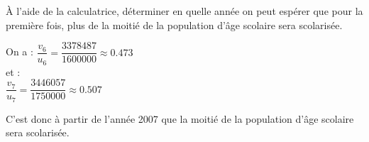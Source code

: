\begin{questions}
\begin{parts}
			
		\end{parts}
	
	\question[2] \`A l'aide de la calculatrice, déterminer en quelle année on peut espérer que pour la première fois, plus de la moitié de la population d'âge scolaire sera scolarisée.
	
	\begin{solution}
		On a :
		$\dfrac{v_6}{u_6} = \dfrac{\num{3378487}}{1600000} \approx \num{0.473}$\\
		
		et :\\
		$\dfrac{v_7}{u_7} = \dfrac{\num{3446057}}{1750000} \approx \num{0.507}$
		
		C'est donc à partir de l'année 2007 que la moitié de la population d'âge scolaire sera scolarisée.
	\end{solution}
\end{questions}


